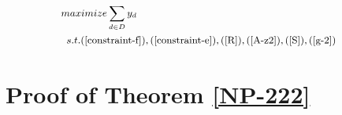 \documentclass[sigconf]{acmart}
\begin{document}
\begin{appendices}
%







\begin{equation}
\small
\begin{aligned} \label{P8}
 &maximize  \sum_{d\in D} y_d\\
&\begin{array}{r@{\quad}r@{}l@{\quad}l}
s.t.
(\ref{constraint-f}), (\ref{constraint-e}), (\ref{R}), (\ref{A-z2}), (\ref{S}), (\ref{g-2})
\end{array}
\end{aligned}
\end{equation}
\section{Proof of Theorem \ref{NP-222}} \label{appendix-proof}


\end{appendices}
\end{document}
